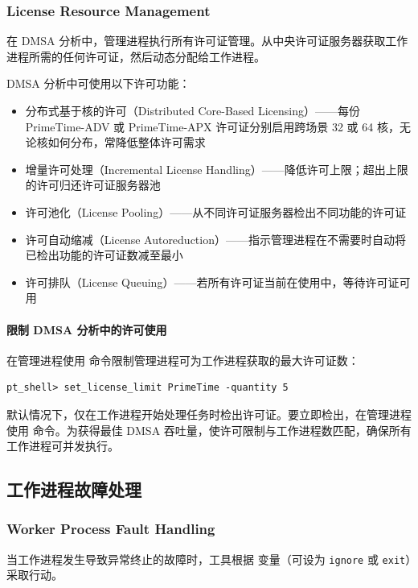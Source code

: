 \subsubsection*{License Resource Management}

在 DMSA 分析中，管理进程执行所有许可证管理。从中央许可证服务器获取工作进程所需的任何许可证，然后动态分配给工作进程。

DMSA 分析中可使用以下许可功能：
\begin{itemize}
  \item 分布式基于核的许可（Distributed Core-Based Licensing）——每份 PrimeTime-ADV 或 PrimeTime-APX 许可证分别启用跨场景 32 或 64 核，无论核如何分布，常降低整体许可需求
  \item 增量许可处理（Incremental License Handling）——降低许可上限；超出上限的许可归还许可证服务器池
  \item 许可池化（License Pooling）——从不同许可证服务器检出不同功能的许可证
  \item 许可自动缩减（License Autoreduction）——指示管理进程在不需要时自动将已检出功能的许可证数减至最小
  \item 许可排队（License Queuing）——若所有许可证当前在使用中，等待许可证可用
\end{itemize}

\paragraph{限制 DMSA 分析中的许可使用}
在管理进程使用  命令限制管理进程可为工作进程获取的最大许可证数：
\begin{lstlisting}
pt_shell> set_license_limit PrimeTime -quantity 5
\end{lstlisting}
默认情况下，仅在工作进程开始处理任务时检出许可证。要立即检出，在管理进程使用  命令。为获得最佳 DMSA 吞吐量，使许可限制与工作进程数匹配，确保所有工作进程可并发执行。

\subsection{工作进程故障处理}
\subsubsection*{Worker Process Fault Handling}

当工作进程发生导致异常终止的故障时，工具根据  变量（可设为 \texttt{ignore} 或 \texttt{exit}）采取行动。

